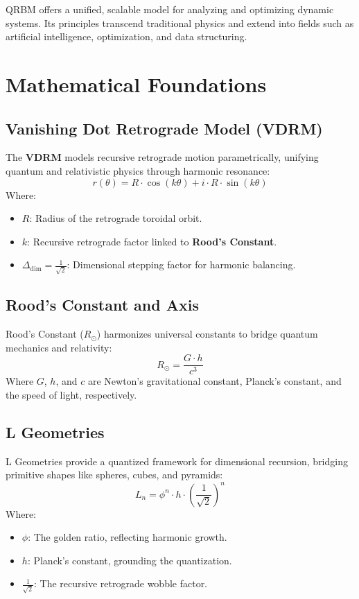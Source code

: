 \documentclass{article}
\begin{document}
QRBM offers a unified, scalable model for analyzing and optimizing dynamic systems. Its principles transcend traditional physics and extend into fields such as artificial intelligence, optimization, and data structuring.

\section*{Mathematical Foundations}

\subsection*{Vanishing Dot Retrograde Model (VDRM)}
The \textbf{VDRM} models recursive retrograde motion parametrically, unifying quantum and relativistic physics through harmonic resonance:
\[
r(\theta) = R \cdot \cos(k \theta) + i \cdot R \cdot \sin(k \theta)
\]
Where:
\begin{itemize}
    \item \(R\): Radius of the retrograde toroidal orbit.
    \item \(k\): Recursive retrograde factor linked to \textbf{Rood’s Constant}.
    \item \(\Delta_{\text{dim}} = \frac{1}{\sqrt{2}}\): Dimensional stepping factor for harmonic balancing.
\end{itemize}

\subsection*{Rood’s Constant and Axis}
Rood’s Constant (\(R_\odot\)) harmonizes universal constants to bridge quantum mechanics and relativity:
\[
R_\odot = \frac{G \cdot h}{c^3}
\]
Where \(G\), \(h\), and \(c\) are Newton’s gravitational constant, Planck’s constant, and the speed of light, respectively.

\subsection*{L Geometries}
L Geometries provide a quantized framework for dimensional recursion, bridging primitive shapes like spheres, cubes, and pyramids:
\[
L_n = \phi^n \cdot h \cdot \left( \frac{1}{\sqrt{2}} \right)^n
\]
Where:
\begin{itemize}
    \item \(\phi\): The golden ratio, reflecting harmonic growth.
    \item \(h\): Planck’s constant, grounding the quantization.
    \item \(\frac{1}{\sqrt{2}}\): The recursive retrograde wobble factor.
\end{itemize}
\end{document}
